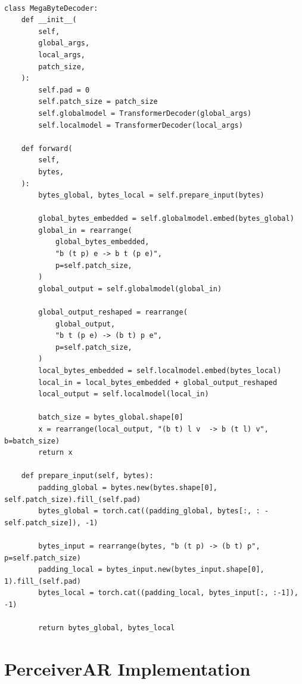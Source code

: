 \documentclass{article}
\theoremstyle{plain}
\theoremstyle{definition}
\theoremstyle{remark}
\begin{document}
\begin{lstlisting}[caption={Pseudocode of Megabyte model}, label={lst:code}]

class MegaByteDecoder:
    def __init__(
        self,
        global_args,
        local_args,
        patch_size,
    ):
        self.pad = 0
        self.patch_size = patch_size
        self.globalmodel = TransformerDecoder(global_args)
        self.localmodel = TransformerDecoder(local_args)

    def forward(
        self,
        bytes,
    ):
        bytes_global, bytes_local = self.prepare_input(bytes)

        global_bytes_embedded = self.globalmodel.embed(bytes_global)
        global_in = rearrange(
            global_bytes_embedded,
            "b (t p) e -> b t (p e)",
            p=self.patch_size,
        )
        global_output = self.globalmodel(global_in)

        global_output_reshaped = rearrange(
            global_output,
            "b t (p e) -> (b t) p e",
            p=self.patch_size,
        )
        local_bytes_embedded = self.localmodel.embed(bytes_local)
        local_in = local_bytes_embedded + global_output_reshaped
        local_output = self.localmodel(local_in)

        batch_size = bytes_global.shape[0]
        x = rearrange(local_output, "(b t) l v  -> b (t l) v", b=batch_size)
        return x

    def prepare_input(self, bytes):
        padding_global = bytes.new(bytes.shape[0], self.patch_size).fill_(self.pad)
        bytes_global = torch.cat((padding_global, bytes[:, : -self.patch_size]), -1)

        bytes_input = rearrange(bytes, "b (t p) -> (b t) p", p=self.patch_size)
        padding_local = bytes_input.new(bytes_input.shape[0], 1).fill_(self.pad)
        bytes_local = torch.cat((padding_local, bytes_input[:, :-1]), -1)

        return bytes_global, bytes_local

\end{lstlisting}


\section{PerceiverAR Implementation}
\label{sec:appendix_par}
\end{document}
